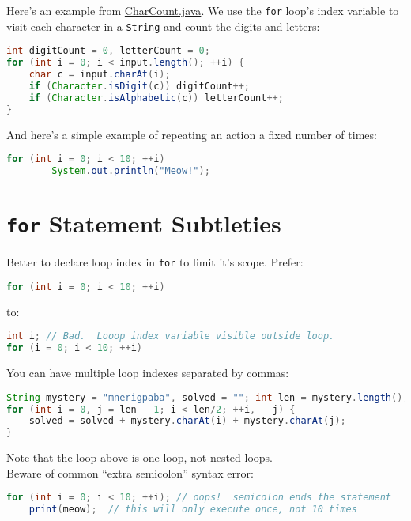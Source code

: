 \documentclass{article}
\begin{document}
Here's an example from  \href{\code/basics/CharCount.java}{CharCount.java}.  We use the {\tt for} loop's index variable to visit each character in a {\tt String} and count the digits and letters:
\begin{lstlisting}[language=Java]
int digitCount = 0, letterCount = 0;
for (int i = 0; i < input.length(); ++i) {
    char c = input.charAt(i);
    if (Character.isDigit(c)) digitCount++;
    if (Character.isAlphabetic(c)) letterCount++;
}
\end{lstlisting}

And here's a simple example of repeating an action a fixed number of times:
\begin{lstlisting}[language=Java]
for (int i = 0; i < 10; ++i)
        System.out.println("Meow!");
\end{lstlisting}




\section{{\tt for} Statement Subtleties}


Better to declare loop index in {\tt for} to limit it's scope.  Prefer:
\vspace{-.05in}
\begin{lstlisting}[language=Java]
for (int i = 0; i < 10; ++i)
\end{lstlisting}
\vspace{-.1in}
to:
\vspace{-.05in}
\begin{lstlisting}[language=Java]
int i; // Bad.  Looop index variable visible outside loop.
for (i = 0; i < 10; ++i)
\end{lstlisting}

You can have multiple loop indexes separated by commas:
\vspace{-.05in}
\begin{lstlisting}[language=Java]
String mystery = "mnerigpaba", solved = ""; int len = mystery.length();
for (int i = 0, j = len - 1; i < len/2; ++i, --j) {
    solved = solved + mystery.charAt(i) + mystery.charAt(j);
}
\end{lstlisting}

Note that the loop above is one loop, not nested loops.\\
\vspace{.025in}
Beware of common ``extra semicolon'' syntax error:
\vspace{-.05in}
\begin{lstlisting}[language=Java]
for (int i = 0; i < 10; ++i); // oops!  semicolon ends the statement
    print(meow);  // this will only execute once, not 10 times
\end{lstlisting}
\end{document}
